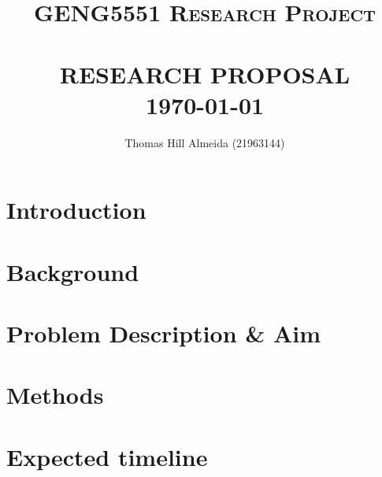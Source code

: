 \documentclass{article}
\title{\normalsize \textsc{GENG5551 Research Project}
        \\ [1.5cm]
        \HRule{0.5pt} \\
        \LARGE \textbf{\uppercase{Research Proposal}}
        \HRule{2pt} \\ [0.5cm]
        \normalsize \today \vspace*{3\baselineskip}}
\author{Thomas Hill Almeida (21963144)}
\date{}
\begin{document}
\maketitle{}
\tableofcontents{}
\newpage{}

\section*{Introduction}
\section{Background}
\section{Problem Description \& Aim}
\section{Methods}
\section{Expected timeline}
\end{document}
